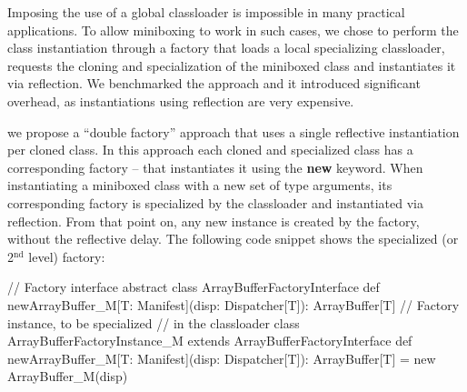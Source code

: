 Imposing the use of a global classloader is impossible in many practical applications. To allow miniboxing to work in such cases, we chose to perform the class instantiation through a factory that loads a local specializing classloader, requests the cloning and specialization of the miniboxed class and instantiates it via reflection. We benchmarked the approach and it introduced significant overhead, as instantiations using reflection are very expensive.

 we propose a ``double factory'' approach that uses a single reflective instantiation per cloned class. In this approach each cloned and specialized class has a corresponding factory -- that instantiates it using the {\bf new} keyword. When instantiating a miniboxed class with a new set of type arguments, its corresponding factory is specialized by the classloader and instantiated via reflection. From that point on, any new instance is created by the factory, without the reflective delay. The following code snippet shows the specialized (or 2$^\text{nd}$ level) factory:

\begin{lstlisting-nobreak}
 // Factory interface
 abstract class ArrayBufferFactoryInterface {
   def newArrayBuffer_M[T: Manifest](disp: Dispatcher[T]): ArrayBuffer[T]
 }
 // Factory instance, to be specialized
 // in the classloader
 class ArrayBufferFactoryInstance_M extends ArrayBufferFactoryInterface {
   def newArrayBuffer_M[T: Manifest](disp: Dispatcher[T]): ArrayBuffer[T] =
     new ArrayBuffer_M(disp)
 }
\end{lstlisting-nobreak}
